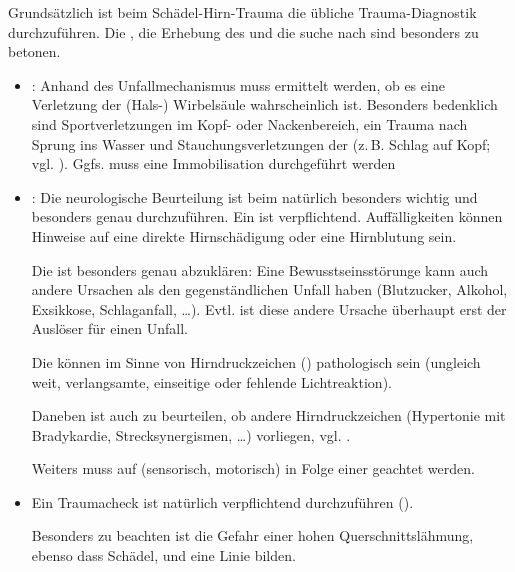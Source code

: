 {\label{topic:sht-diagnostik}%
Grundsätzlich ist beim Schädel-Hirn-Trauma die übliche
Trauma-Diagnostik durchzuführen. Die , die Erhebung des  und die
suche nach  sind
besonders zu betonen.

\begin{itemize}
  \item {}: Anhand des
  Unfallmechanismus muss ermittelt werden, ob es eine
  Verletzung der (Hals-) Wirbelsäule wahrscheinlich ist.
  Besonders bedenklich sind Sportverletzungen im Kopf- oder
  Nackenbereich, ein Trauma nach Sprung ins Wasser und
  Stauchungsverletzungen der  (z.\,B. Schlag auf
  Kopf;
  vgl.
  ).
  Ggfs. muss eine Immobilisation durchgeführt werden
  \item {}:
  Die neurologische Beurteilung ist beim  natürlich
  besonders wichtig und besonders genau durchzuführen. Ein
   ist verpflichtend. Auffälligkeiten können
  Hinweise auf eine direkte Hirnschädigung oder eine Hirnblutung sein.
  
  Die
   ist besonders genau abzuklären: Eine
  Bewusstseinsstörunge kann auch andere
  Ursachen als den gegenständlichen Unfall haben (Blutzucker,
  Alkohol, Exsikkose, Schlaganfall, \ldots). Evtl. ist diese
  andere Ursache überhaupt erst der Auslöser für einen Unfall.
  
  Die  können im Sinne von Hirndruckzeichen
  () pathologisch sein
  (ungleich weit, verlangsamte, einseitige oder fehlende
  Lichtreaktion).
  
  Daneben ist auch zu beurteilen, ob andere Hirndruckzeichen
  (Hypertonie mit Bradykardie, Strecksynergismen, \ldots)
  vorliegen, vgl. .
  
  Weiters muss auf  (sensorisch,
  motorisch) in Folge einer  geachtet
  werden.
  
  \item {} Ein Traumacheck ist natürlich
  verpflichtend durchzuführen
  ().
  
  Besonders zu beachten ist die Gefahr einer hohen
  Querschnittslähmung, ebenso dass Schädel,  und
   eine
  Linie bilden.
  

\end{itemize}}

